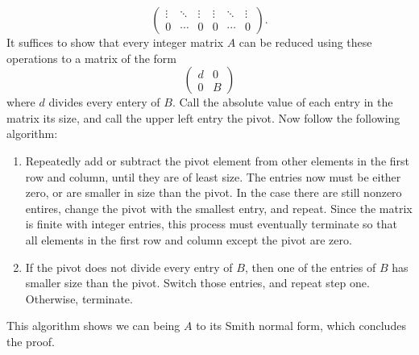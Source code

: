 \documentclass[11pt,a4paper]{article}
\begin{document}
\begin{solution}
\[\begin{pmatrix}
      \vdots & \ddots & \vdots & \vdots & \ddots & \vdots \\
      0 & \cdots & 0 & 0 & \cdots & 0
    \end{pmatrix}.
  \]
  It suffices to show that every integer matrix $A$ can be reduced using
  these operations to a matrix of the form
  \[
    \begin{pmatrix}
      d & 0 \\
      0 & B
    \end{pmatrix}
  \]
  where $d$ divides every entery of $B$.
  Call the absolute value of each entry in the matrix its size,
  and call the upper left entry the pivot.
  Now follow the following algorithm:
  \begin{enumerate}
    \item[(step 1)]
      Repeatedly add or subtract the pivot element from other elements
      in the first row and column, until they are of least size.
      The entries now must be either zero,
      or are smaller in size than the pivot.
      In the case there are still nonzero entires,
      change the pivot with the smallest entry, and repeat.
      Since the matrix is finite with integer entries,
      this process must eventually terminate so that all elements in
      the first row and column except the pivot are zero.
    \item[(step 2)]
      If the pivot does not divide every entry of $B$,
      then one of the entries of $B$ has smaller size than the pivot.
      Switch those entries, and repeat step one.
      Otherwise, terminate.
  \end{enumerate}
  This algorithm shows we can being $A$ to its Smith normal form,
  which concludes the proof.
\end{solution}
\end{document}
